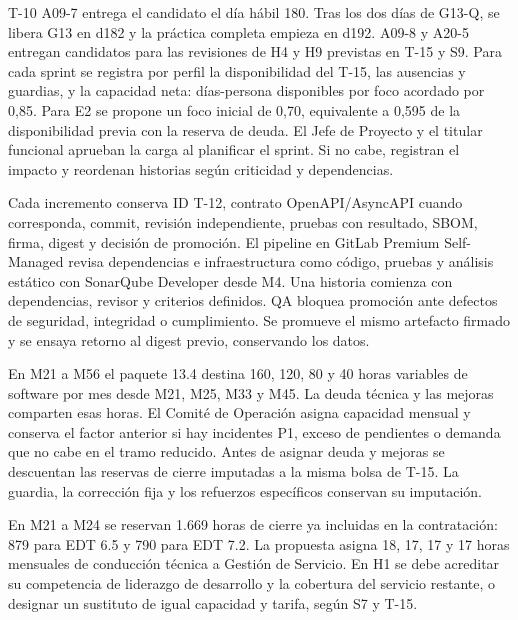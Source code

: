 \begin{formulario}{T-10}
A09-7 entrega el candidato el día hábil 180. Tras los dos días de G13-Q, se libera G13 en d182 y la práctica completa empieza en d192. A09-8 y A20-5 entregan candidatos para las revisiones de H4 y H9 previstas en T-15 y S9. Para cada sprint se registra por perfil la disponibilidad del T-15, las ausencias y guardias, y la capacidad neta: días-persona disponibles por foco acordado por 0,85. Para E2 se propone un foco inicial de 0,70, equivalente a 0,595 de la disponibilidad previa con la reserva de deuda. El Jefe de Proyecto y el titular funcional aprueban la carga al planificar el sprint. Si no cabe, registran el impacto y reordenan historias según criticidad y dependencias.

Cada incremento conserva ID T-12, contrato OpenAPI/AsyncAPI cuando corresponda, commit, revisión independiente, pruebas con resultado, SBOM, firma, digest y decisión de promoción. El pipeline en GitLab Premium Self-Managed revisa dependencias e infraestructura como código, pruebas y análisis estático con SonarQube Developer desde M4. Una historia comienza con dependencias, revisor y criterios definidos. QA bloquea promoción ante defectos de seguridad, integridad o cumplimiento. Se promueve el mismo artefacto firmado y se ensaya retorno al digest previo, conservando los datos.

En M21 a M56 el paquete 13.4 destina 160, 120, 80 y 40 horas variables de software por mes desde M21, M25, M33 y M45. La deuda técnica y las mejoras comparten esas horas. El Comité de Operación asigna capacidad mensual y conserva el factor anterior si hay incidentes P1, exceso de pendientes o demanda que no cabe en el tramo reducido. Antes de asignar deuda y mejoras se descuentan las reservas de cierre imputadas a la misma bolsa de T-15. La guardia, la corrección fija y los refuerzos específicos conservan su imputación.

En M21 a M24 se reservan 1.669 horas de cierre ya incluidas en la contratación: 879 para EDT 6.5 y 790 para EDT 7.2. La propuesta asigna 18, 17, 17 y 17 horas mensuales de conducción técnica a Gestión de Servicio. En H1 se debe acreditar su competencia de liderazgo de desarrollo y la cobertura del servicio restante, o designar un sustituto de igual capacidad y tarifa, según S7 y T-15.
\end{formulario}
